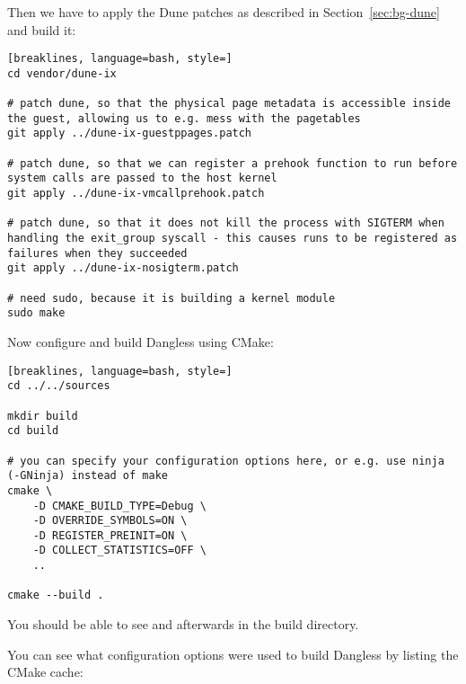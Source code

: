 Then we have to apply the Dune patches as described in Section~\ref{sec:bg-dune} and build it:

\begin{lstlisting}[breaklines, language=bash, style=]
cd vendor/dune-ix

# patch dune, so that the physical page metadata is accessible inside the guest, allowing us to e.g. mess with the pagetables
git apply ../dune-ix-guestppages.patch

# patch dune, so that we can register a prehook function to run before system calls are passed to the host kernel
git apply ../dune-ix-vmcallprehook.patch

# patch dune, so that it does not kill the process with SIGTERM when handling the exit_group syscall - this causes runs to be registered as failures when they succeeded
git apply ../dune-ix-nosigterm.patch

# need sudo, because it is building a kernel module
sudo make
\end{lstlisting}

Now configure and build Dangless using CMake:

\begin{lstlisting}[breaklines, language=bash, style=]
cd ../../sources

mkdir build
cd build

# you can specify your configuration options here, or e.g. use ninja (-GNinja) instead of make
cmake \
	-D CMAKE_BUILD_TYPE=Debug \
	-D OVERRIDE_SYMBOLS=ON \
	-D REGISTER_PREINIT=ON \
	-D COLLECT_STATISTICS=OFF \
	..

cmake --build .
\end{lstlisting}

You should be able to see  and  afterwards in the build directory.

You can see what configuration options were used to build Dangless by listing the CMake cache:

